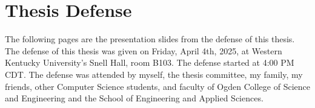 \chapter{Thesis Defense}
\label{appendix:defense}

\par The following pages are the presentation slides from the defense of this thesis. The defense of this thesis was given on Friday, April 4th, 2025, at Western Kentucky University's Snell Hall, room B103. The defense started at 4:00 PM CDT. The defense was attended by myself, the thesis committee, my family, my friends, other Computer Science students, and faculty of Ogden College of Science and Engineering and the School of Engineering and Applied Sciences.


